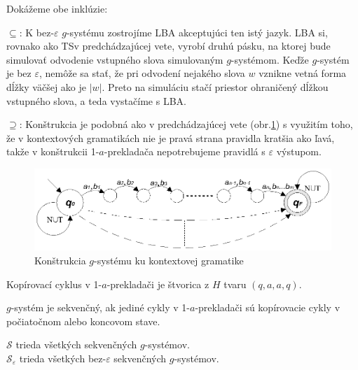 \begin{dokaz}
Dokážeme obe inklúzie:
\begin{description}
\item{$\subseteq$:} K bez-$\varepsilon$ $g$-systému zostrojíme LBA
akceptujúci ten istý jazyk. LBA si, rovnako ako TS\linebreak v
predchádzajúcej vete, vyrobí druhú pásku, na ktorej bude simulovať
odvodenie vstupného slova simulovaným $g$-systémom. Keďže
$g$-systém je bez $\varepsilon$, nemôže sa stať, že pri odvodení
nejakého slova $w$ vznikne vetná forma dĺžky väčšej ako je $|w|$.
Preto na simuláciu stačí priestor ohraničený dĺžkou vstupného
slova, a teda vystačíme s LBA.
\item{$\supseteq$:} Konštrukcia je podobná ako v predchádzajúcej vete
(obr.\ref{gs_obr_gcs}) s využitím toho, že v kontextových gramatikách nie
je pravá strana pravidla kratšia ako ľavá, takže v konštrukcii
1-$a$-prekladača nepotrebujeme pravidlá s $\varepsilon$ výstupom.
\end{description}
\end{dokaz}

\begin{figure}
\centering
\includegraphics{./OBRAZKY/GSYSTEMS/CS_G}
\caption{Konštrukcia $g$-systému ku kontextovej gramatike}\label{gs_obr_gcs}
\end{figure}

\begin{definicia}
Kopírovací cyklus v 1-$a$-prekladači je štvorica z $H$ tvaru
$(q,a,a,q)$.
\end{definicia}

\begin{definicia}
$g$-systém je sekvenčný, ak jediné cykly v 1-$a$-prekladači sú
kopírovacie cykly v počiatočnom alebo koncovom stave.
\end{definicia}

\begin{oznacenie}
$\mathcal{S}$ trieda všetkých sekvenčných $g$-systémov.\\
$\mathcal{S}_\varepsilon$ trieda všetkých bez-$\varepsilon$
sekvenčných $g$-systémov.
\end{oznacenie}

